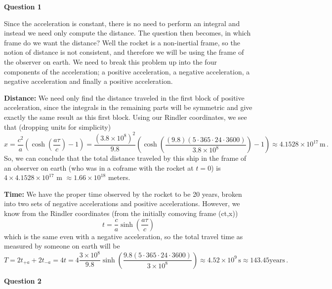 \documentclass[10pt]{article}
\begin{document}
\textbf{Question 1}

Since the acceleration is constant, there is no need to perform an integral and instead we need only compute the distance. The question then becomes, in which frame do we want the distance? Well the rocket is a non-inertial frame, so the notion of distance is not consistent, and therefore we will be using the frame of the observer on earth. We need to break this problem up into the four components of the acceleration; a positive acceleration, a negative acceleration, a negative acceleration and finally a positive acceleration.

\textbf{Distance:} We need only find the distance traveled in the first block of positive acceleration, since the integrals in the remaining parts will be symmetric and give exactly the same result as this first block. Using our Rindler coordinates, we see that (dropping units for simplicity)
\[ x = \frac{c^{2}}{a}\left(\cosh\left(\frac{a\tau}{c}\right) - 1\right) = \frac{(3.8\times 10^{8})^{2}}{9.8}\left(\cosh\left(\frac{(9.8)(5\cdot365\cdot24\cdot3600)}{3.8\times 10^{8}}\right) - 1\right) \approx 4.1528 \times 10^{17}\,\text{m}\, .\]
So, we can conclude that the total distance traveled by this ship in the frame of an observer on earth (who was in a coframe with the rocket at $t=0$) is $4\times4.1528\times 10^{17}$ m $\approx 1.66\times 10^{18}$ meters.

\textbf{Time:} We have the proper time observed by the rocket to be 20 years, broken into two sets of negative accelerations and positive accelerations. However, we know from the Rindler coordinates (from the initially comoving frame (ct,x))
\[ t = \frac{c}{a}\sinh\left(\frac{a\tau}{c}\right) \]
which is the same even with a negative acceleration, so the total travel time as measured by someone on earth will be
\[ T = 2t_{+a} + 2t_{-a} = 4t = 4\frac{3\times 10^{8}}{9.8}\sinh\left(\frac{9.8(5\cdot365\cdot 24\cdot 3600)}{3\times 10^{8}}\right) \approx 4.52 \times 10^{9} \, \text{s} \approx 143.45 \text{years}\, . \]

\newpage
\textbf{Question 2}
\end{document}
